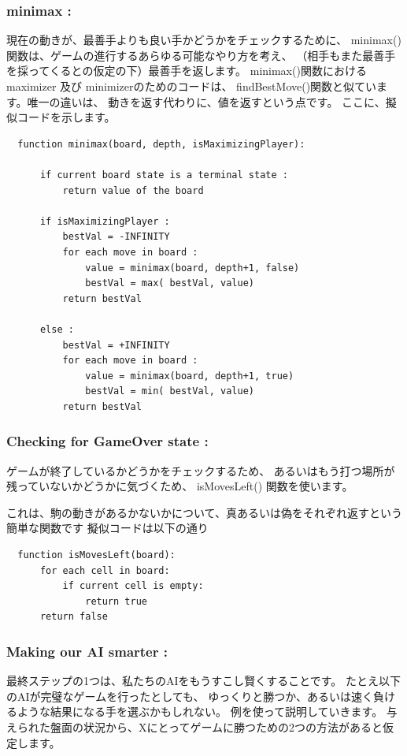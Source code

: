 \documentclass[uplatex,a4paper,11pt,oneside,openany]{jsbook}
\begin{document}
\subsubsection{minimax :}

現在の動きが、最善手よりも良い手かどうかをチェックするために、
minimax()関数は、ゲームの進行するあらゆる可能なやり方を考え、
（相手もまた最善手を採ってくるとの仮定の下）最善手を返します。
minimax()関数におけるmaximizer 及び minimizerのためのコードは、
findBestMove()関数と似ています。唯一の違いは、
動きを返す代わりに、値を返すという点です。
ここに、擬似コードを示します。

\begin{verbatim}
  function minimax(board, depth, isMaximizingPlayer):

      if current board state is a terminal state :
          return value of the board

      if isMaximizingPlayer :
          bestVal = -INFINITY
          for each move in board :
              value = minimax(board, depth+1, false)
              bestVal = max( bestVal, value)
          return bestVal

      else :
          bestVal = +INFINITY
          for each move in board :
              value = minimax(board, depth+1, true)
              bestVal = min( bestVal, value)
          return bestVal
\end{verbatim}

\subsubsection{Checking for GameOver state :}

ゲームが終了しているかどうかをチェックするため、
あるいはもう打つ場所が残っていないかどうかに気づくため、
isMovesLeft() 関数を使います。

これは、駒の動きがあるかないかについて、真あるいは偽をそれぞれ返すという簡単な関数です
擬似コードは以下の通り

\begin{verbatim}
  function isMovesLeft(board):
      for each cell in board:
          if current cell is empty:
              return true
      return false
\end{verbatim}

\subsubsection{Making our AI smarter :}

最終ステップの1つは、私たちのAIをもうすこし賢くすることです。
たとえ以下のAIが完璧なゲームを行ったとしても、
ゆっくりと勝つか、あるいは速く負けるような結果になる手を選ぶかもしれない。
例を使って説明していきます。
与えられた盤面の状況から、Xにとってゲームに勝つための2つの方法があると仮定します。
\end{document}
